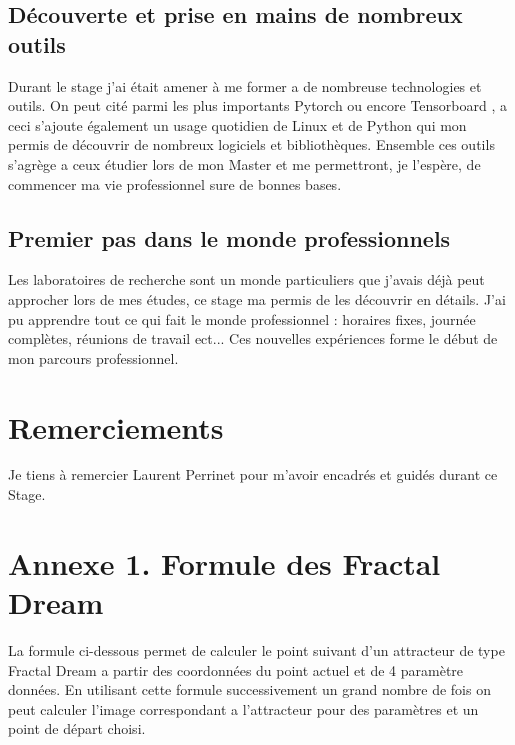 \documentclass[11pt,francais]{article}
\begin{document}
\subsection{Découverte et prise en mains de nombreux outils}
Durant le stage j'ai était amener à me former a de nombreuse technologies et outils.
On peut cité parmi les plus importants Pytorch \cite{paszke2017automatic} ou encore Tensorboard \cite{tensorflow2015-whitepaper}, a ceci s'ajoute également un usage quotidien de Linux et de Python qui mon permis de découvrir de nombreux logiciels et bibliothèques.
Ensemble ces outils s'agrège a ceux étudier lors de mon Master et me permettront, je l'espère, de commencer ma vie professionnel sure de bonnes bases.

\subsection{Premier pas dans le monde professionnels}
Les laboratoires de recherche sont un monde particuliers que j'avais déjà peut approcher lors de mes études, ce stage ma permis de les découvrir en détails. J'ai pu apprendre tout ce qui fait le monde professionnel : horaires fixes, journée complètes, réunions de travail ect...
Ces nouvelles expériences forme le début de mon parcours professionnel.

\newpage


\section*{Remerciements}
Je tiens à remercier Laurent Perrinet pour m'avoir encadrés et guidés durant ce Stage.



\newpage
\section*{Annexe 1. Formule des Fractal Dream}
\label{sec:annexe1}
La formule ci-dessous permet de calculer le point suivant d'un attracteur de type Fractal Dream a partir des coordonnées du point actuel et de 4 paramètre données.
En utilisant cette formule successivement un grand nombre de fois on peut calculer l'image correspondant a l'attracteur pour des paramètres et un point de départ choisi.  
\end{document}
